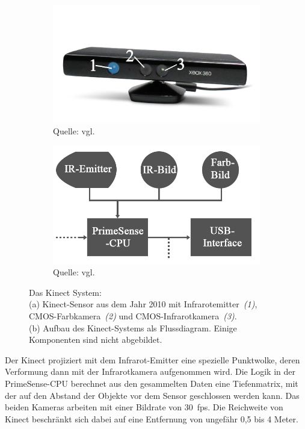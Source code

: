 \begin{figure}
\centering
\begin{subfigure}{.5\textwidth} 
  \centering
  \includegraphics[width=.95\linewidth]{bilder/kinectSensor.png}
  \caption{Quelle: vgl. \cite{kinectSensorBild}}
  \label{fig:kinectSensor}
\end{subfigure}%
\begin{subfigure}{.5\textwidth} 
  \centering
  \includegraphics[width=.95\linewidth]{bilder/KinectAufbau.png}
  \caption{Quelle: vgl. \cite{kinectAufbauBild}}
  \label{fig:kinectAufbau}
\end{subfigure}
\caption{Das Kinect System: \\ (a) Kinect-Sensor aus dem Jahr 2010 mit Infrarotemitter~\textit{(1)}, CMOS-Farbkamera~\textit{(2)} und CMOS-Infrarotkamera~\textit{(3)}. \\ (b) Aufbau des Kinect-Systems als Flussdiagram. Einige Komponenten sind nicht abgebildet.}
\label{fig:kinextSystem}
\end{figure}

Der Kinect projiziert mit dem Infrarot-Emitter eine spezielle Punktwolke, deren Verformung dann mit der Infrarotkamera aufgenommen wird. Die Logik in der PrimeSense-CPU berechnet aus den gesammelten Daten eine Tiefenmatrix, mit der auf den Abstand der Objekte vor dem Sensor geschlossen werden kann. Das beiden Kameras arbeiten mit einer Bildrate von 30~fps. Die Reichweite von Kinect beschränkt sich dabei auf eine Entfernung von ungefähr 0,5 bis 4 Meter.~\cite{hannaKinect1} 

